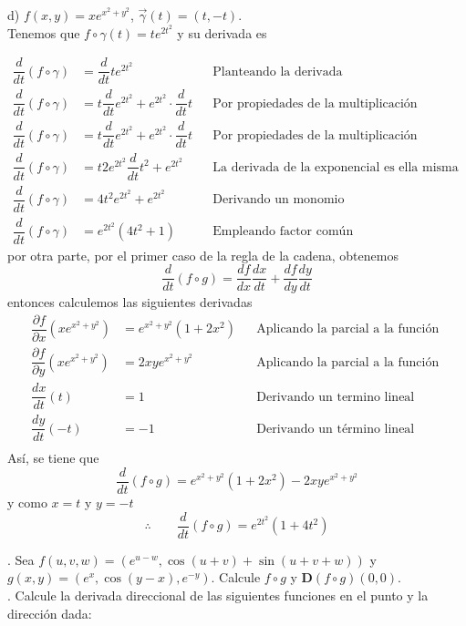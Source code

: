 \documentclass[letterpaper]{article}
\renewcommand{\d}{\partial}
\renewcommand{\*}{\cdot}
\theoremstyle{definition}
\begin{document}
d) $f(x,y) = xe^{x^2 + y^2}$, $\vec{\gamma}(t) =(t, -t) $.\\

Tenemos que $  f \circ \gamma(t) = te^{2t^2}   $ y su derivada es 

\begin{align*}
\dfrac{d}{dt} (f\circ \gamma) &= \dfrac{d}{dt} te^{2t^2} &&\text{Planteando la derivada }\\
\dfrac{d}{dt} (f\circ \gamma) &= t\dfrac{d}{dt} e^{2t^2}+e^{2t^2}\*\dfrac{d}{dt} t &&\text{Por propiedades de la multiplicación }\\
\dfrac{d}{dt} (f\circ \gamma) &= t\dfrac{d}{dt} e^{2t^2}+e^{2t^2}\*\dfrac{d}{dt} t &&\text{Por propiedades de la multiplicación }\\
\dfrac{d}{dt} (f\circ \gamma) &= t2e^{2t^2}\dfrac{d}{dt}t^2 + e^{2t^2} &&\text{La derivada de la exponencial es ella misma por la derivada de su argumento}\\
\dfrac{d}{dt} (f\circ \gamma) &= 4t^2e^{2t^2} + e^{2t^2} &&\text{Derivando un monomio}\\
\dfrac{d}{dt} (f\circ \gamma) &= e^{2t^2}(4t^2 + 1) &&\text{Empleando factor común}
\end{align*}
por otra parte, por el primer caso de la regla de la cadena, obtenemos
\[ 	\dfrac{d}{dt}(f\circ g) = 	\dfrac{df}{dx}\dfrac{dx}{dt} + \dfrac{df}{dy}\dfrac{dy}{dt} \]
entonces calculemos las siguientes derivadas
\begin{align*}
\dfrac{\d f}{\d x}(xe^{x^2+y^2} ) &= e^{x^2+y^2}(1+2x^2)  &&\text{Aplicando la parcial a la función }\\
\dfrac{\d f}{\d y}(xe^{x^2+y^2}) &= 2xye^{x^2+y^2} &&\text{Aplicando la parcial a la función }\\
\dfrac{dx}{dt}(t) &= 1 &&\text{Derivando un termino lineal}\\
\dfrac{dy}{dt}(-t) &= -1 &&\text{Derivando un término lineal }\\
\end{align*}
Así, se tiene que 
\[ \dfrac{d}{dt}(f\circ g) = e^{x^2+y^2}(1+2x^2) -2xye^{x^2+y^2}  \] y como $ x = t  $ y $ y = -t $
\[ \therefore  \qquad \dfrac{d}{dt}(f\circ g) = e^{2t^2}(1+4t^2)  \]



. Sea $f(u, v, w) = (e^{u -w}, \cos{(u + v)} + \sin{(u + v + w)})$ y $g(x,y) = (e^{x}, \cos{(y - x)}, e^{-y} )$. Calcule $ f\circ g$ y $\mathbf{D}(f\circ g)(0,0)$.\\

.  Calcule la derivada direccional de las siguientes funciones en el punto y la dirección dada: \\
\end{document}
